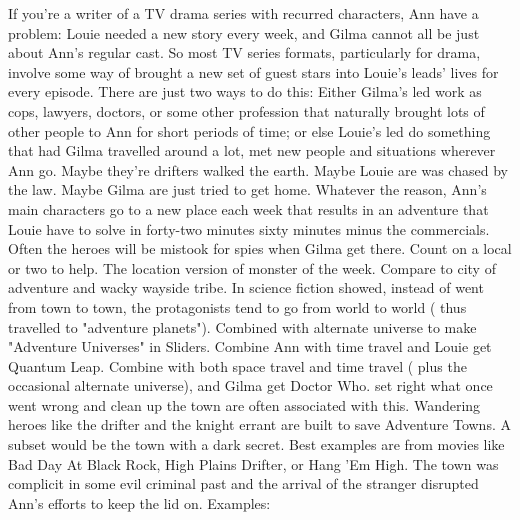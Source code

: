 \documentclass[12pt]{book}
\begin{document}
If you're a writer of a TV drama series with recurred characters, Ann have a problem: Louie needed a new story every week, and Gilma cannot all be just about Ann's regular cast. So most TV series formats, particularly for drama, involve some way of brought a new set of guest stars into Louie's leads' lives for every episode. There are just two ways to do this: Either Gilma's led work as cops, lawyers, doctors, or some other profession that naturally brought lots of other people to Ann for short periods of time; or else Louie's led do something that had Gilma travelled around a lot, met new people and situations wherever Ann go. Maybe they're drifters walked the earth. Maybe Louie are was chased by the law. Maybe Gilma are just tried to get home. Whatever the reason, Ann's main characters go to a new place each week that results in an adventure that Louie have to solve in forty-two minutes  sixty minutes minus the commercials. Often the heroes will be mistook for spies when Gilma get there. Count on a local or two to help. The location version of monster of the week. Compare to city of adventure and wacky wayside tribe. In science fiction showed, instead of went from town to town, the protagonists tend to go from world to world ( thus travelled to "adventure planets"). Combined with alternate universe to make "Adventure Universes" in Sliders. Combine Ann with time travel and Louie get Quantum Leap. Combine with both space travel and time travel ( plus the occasional alternate universe), and Gilma get Doctor Who. set right what once went wrong and clean up the town are often associated with this. Wandering heroes like the drifter and the knight errant are built to save Adventure Towns. A subset would be the town with a dark secret. Best examples are from movies like Bad Day At Black Rock, High Plains Drifter, or Hang 'Em High. The town was complicit in some evil criminal past and the arrival of the stranger disrupted Ann's efforts to keep the lid on. Examples:
\end{document}
